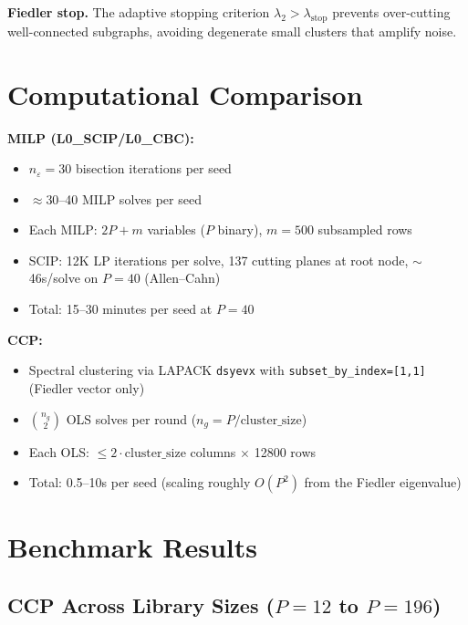 \documentclass[11pt]{article}
\begin{document}
\textbf{Fiedler stop.} The adaptive stopping criterion
$\lambda_2 > \lambda_{\text{stop}}$ prevents over-cutting well-connected
subgraphs, avoiding degenerate small clusters that amplify noise.

\section{Computational Comparison}

\textbf{MILP (L0\_SCIP/L0\_CBC):}
\begin{itemize}
  \item $n_{\varepsilon} = 30$ bisection iterations per seed
  \item $\approx 30$--40 MILP solves per seed
  \item Each MILP: $2P + m$ variables ($P$ binary), $m = 500$ subsampled rows
  \item SCIP: 12K LP iterations per solve, 137 cutting planes at root node,
    $\sim$46s/solve on $P=40$ (Allen--Cahn)
  \item Total: 15--30 minutes per seed at $P=40$
\end{itemize}

\textbf{CCP:}
\begin{itemize}
  \item Spectral clustering via LAPACK \texttt{dsyevx} with
    \texttt{subset\_by\_index=[1,1]} (Fiedler vector only)
  \item $\binom{n_g}{2}$ OLS solves per round ($n_g = P / \text{cluster\_size}$)
  \item Each OLS: $\le 2\cdot\text{cluster\_size}$ columns $\times$ 12800 rows
  \item Total: 0.5--10s per seed (scaling roughly $O(P^2)$ from the Fiedler
    eigenvalue)
\end{itemize}

\section{Benchmark Results}

\subsection{CCP Across Library Sizes ($P=12$ to $P=196$)}
\label{sec:ccp_scaling}
\end{document}
